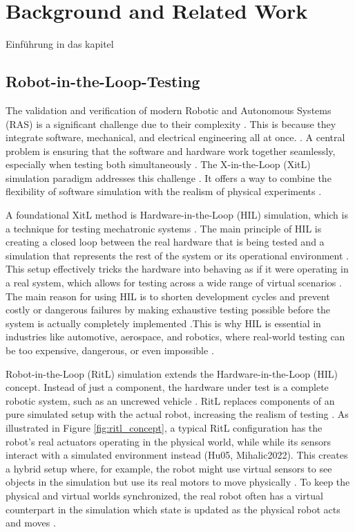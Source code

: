\chapter{Background and Related Work}
\label{chap:background}
Einführung in das kapitel \cite{NOT FINAL}
 \section{Robot-in-the-Loop-Testing}
\label{sec:RitL}
The validation and verification of modern Robotic and Autonomous Systems (RAS) is a significant challenge due to their complexity \cite{AMV23}. This is because they integrate software, mechanical, and electrical engineering all at once. \cite{AMV23}. A central problem is ensuring that the software and hardware work together seamlessly, especially when testing both simultaneously \cite{AMV23}. The X-in-the-Loop (XitL) simulation paradigm addresses this challenge \cite{Brayanov2019}. It offers a way to combine the flexibility of software simulation with the realism of physical experiments \cite{Brayanov2019}.

A foundational XitL method is Hardware-in-the-Loop (HIL) simulation, which is a technique for testing mechatronic systems \cite{Mihalic2022, Brayanov2019}. The main principle of HIL is creating a closed loop between the real hardware that is being tested and a simulation that represents the rest of the system or its operational environment \cite{Mihalic2022}. This setup effectively tricks the hardware into behaving as if it were operating in a real system, which allows for testing across a wide range of virtual scenarios \cite{Brayanov2019}. The main reason for using HIL is to shorten development cycles and prevent costly or dangerous failures by making exhaustive testing possible before the system is actually completely implemented \cite{Mihalic2022}.This is why HIL is essential in industries like automotive, aerospace, and robotics, where real-world testing can be too expensive, dangerous, or even impossible \cite{Brayanov2019}.

Robot-in-the-Loop (RitL) \cite{Mihalic2022} simulation extends the Hardware-in-the-Loop (HIL) concept. Instead of just a component, the hardware under test is a complete robotic system, such as an uncrewed vehicle \cite{Mihalic2022}. RitL replaces components of an pure simulated setup with the actual robot, increasing the realism of testing \cite{Hu05}. As illustrated in Figure \ref{fig:ritl_concept}, a typical RitL configuration has the robot's real actuators operating in the physical world, while while its sensors interact with a simulated environment instead (Hu05, Mihalic2022). This creates a hybrid setup where, for example, the robot might use virtual sensors to see objects in the simulation but use its real motors to move physically \cite{Hu05}. To keep the physical and virtual worlds synchronized, the real robot often has a virtual counterpart in the simulation which state is updated as the physical robot acts and moves \cite{Hu05}.

